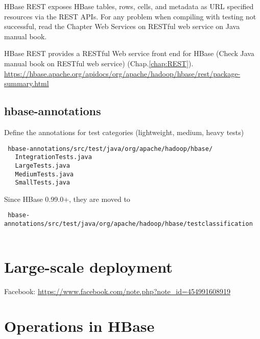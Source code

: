 HBase REST exposes HBase tables, rows, cells, and metadata as URL specified
resources via the REST APIs. For any problem when compiling with testing not
successful, read the Chapter Web Services on RESTful web service on Java manual book.

HBase REST provides a RESTful Web service front end for HBase (Check Java
manual book on RESTful web service) (Chap.\ref{chap:REST}).
\url{https://hbase.apache.org/apidocs/org/apache/hadoop/hbase/rest/package-summary.html}

% 
% 



\subsection{hbase-annotations}

Define the annotations for test categories (lightweight, medium, heavy tests)
\begin{verbatim}
 hbase-annotations/src/test/java/org/apache/hadoop/hbase/
   IntegrationTests.java  
   LargeTests.java        
   MediumTests.java      
   SmallTests.java   
\end{verbatim}

Since HBase 0.99.0+, they are moved to
\begin{verbatim}
 hbase-annotations/src/test/java/org/apache/hadoop/hbase/testclassification
 
\end{verbatim}

\section{Large-scale deployment}

Facebook: \url{https://www.facebook.com/note.php?note_id=454991608919}
 
\section{Operations in HBase}


